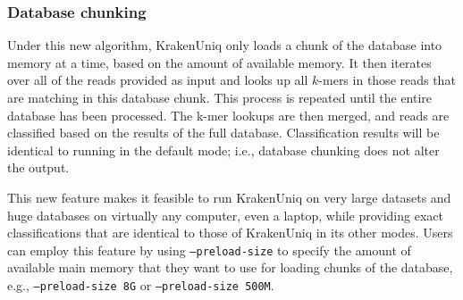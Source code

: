 \documentclass{article}
\def\code#1{\texttt{#1}}
\begin{document}
\subsubsection*{Database chunking} 
Under this new algorithm, KrakenUniq only loads a chunk of the database into memory at a time, based on the amount of available memory. It then iterates over all of the reads provided as input and looks up all $k$-mers in those reads that are matching in this database chunk. This process is repeated until the entire database has been processed. The k-mer lookups are then merged, and reads are classified based on the results of the full database. Classification results will be identical to running in the default mode; i.e., database chunking does not alter the output. 

This new feature makes it feasible to run KrakenUniq on very large datasets and huge databases on virtually any computer, even a laptop, while providing exact classifications that are identical to those of KrakenUniq in its other modes. Users can employ this feature by using \code{--preload-size} to specify the amount of available main memory that they want to use for loading chunks of the database, e.g., \code{--preload-size 8G} or \code{--preload-size 500M}. 
\end{document}
